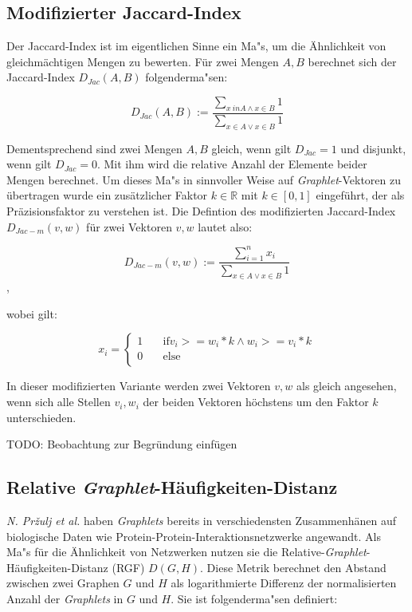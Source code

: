 \documentclass{report}
\begin{document}
\subsection{Modifizierter Jaccard-Index}

Der Jaccard-Index ist im eigentlichen Sinne ein Ma"s, um die \"Ahnlichkeit von gleichm\"achtigen Mengen zu bewerten. F\"ur zwei Mengen $A,B$ berechnet sich der Jaccard-Index $D_{Jac}(A,B)$ folgenderma"sen:

\[ D_{Jac}(A,B) := \frac{\sum_{x \ in A \land x \in B} 1}{\sum_{x \in A \lor x \in B} 1} \]

Dementsprechend sind zwei Mengen $A,B$ gleich, wenn  gilt $D_{Jac} = 1$ und disjunkt, wenn gilt $D_{Jac} = 0$. Mit ihm wird die relative Anzahl der Elemente beider Mengen berechnet.
Um dieses Ma"s in sinnvoller Weise auf \textit{Graphlet}-Vektoren zu \"ubertragen wurde ein zus\"atzlicher Faktor $k \in \mathbb{R} $ mit $k \in [0,1]$  eingef\"uhrt, der als Pr\"azisionsfaktor zu verstehen ist. Die Defintion des modifizierten Jaccard-Index $D_{Jac-m}(v,w)$ f\"ur zwei Vektoren $v,w$ lautet also:

\[ D_{Jac-m}(v,w) := \frac{\sum_{i = 1}^n x_i}{\sum_{x \in A \lor x \in B} 1} \],

wobei gilt:

\[ x_i = 
   \begin{cases}
     1     & \quad \mathrm{if} v_i >= w_i * k \land w_i >= v_i * k \\
     0     & \quad \mathrm{else} \\
   \end{cases}
\]

In dieser modifizierten Variante werden zwei Vektoren $v,w$ als gleich angesehen, wenn sich alle Stellen $v_i,w_i$ der beiden Vektoren h\"ochstens um den Faktor $k$ unterschieden.

TODO: Beobachtung zur Begr\"undung einf\"ugen


\subsection{Relative \textit{Graphlet}-H\"aufigkeiten-Distanz}

\textit{N. Pr\v{z}ulj et al.} haben \textit{Graphlets} bereits in verschiedensten Zusammenh\"anen auf biologische Daten wie Protein-Protein-Interaktionsnetzwerke \cite{frqdistribution} angewandt. Als Ma"s f\"ur die \"Ahnlichkeit von Netzwerken nutzen sie die Relative-\textit{Graphlet}-H\"aufigkeiten-Distanz (RGF) $D(G,H)$. Diese Metrik berechnet den Abstand zwischen zwei Graphen $G$ und $H$ als logarithmierte Differenz der normalisierten Anzahl der \textit{Graphlets} in $G$ und $H$. Sie ist folgenderma"sen definiert: \\
\end{document}
